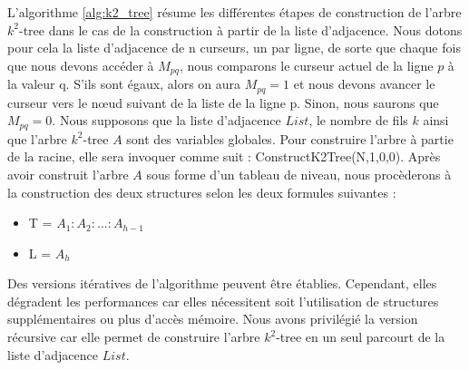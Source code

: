 \documentclass[a4paper,oneside,12pt]{report}
\theoremstyle{definition}
\begin{document}
			L'algorithme \ref{alg:k2_tree} résume les différentes étapes de construction de l'arbre $k^2$-tree dans le cas de la construction à partir de la liste d'adjacence. Nous dotons pour cela la liste d'adjacence de n curseurs, un par ligne, de sorte que chaque fois que nous devons accéder à $M_{pq}$, nous comparons le curseur actuel de la ligne $p$ à la valeur q. S'ils sont égaux, alors on aura $M_{pq} = 1$ et nous devons avancer le curseur vers le nœud suivant de la liste de la ligne p. Sinon, nous saurons que $M_{pq} = 0$. Nous supposons que la liste d'adjacence $List$, le nombre de fils $k$ ainsi que l'arbre $k^2$-tree $A$ sont des variables globales. Pour construire l'arbre à partie de la racine, elle sera invoquer comme suit :  ConstructK2Tree(N,1,0,0). Après avoir construit l'arbre $A$ sous forme d'un tableau de niveau, nous procèderons à la construction des deux structures selon les deux formules suivantes :
			\begin{itemize}[label=$\bullet$]
			 	\item T = $A_1: A_2:. . . :A_{h-1}$
			 	\item L = $A_h$
			\end{itemize}	

Des versions itératives de l'algorithme peuvent être établies. Cependant, elles dégradent les performances car elles nécessitent soit l'utilisation de structures supplémentaires ou plus d'accès mémoire. Nous avons privilégié la version récursive car elle permet de construire l'arbre $k^2$-tree en un seul parcourt de la liste d'adjacence $List$.\\
\end{document}
